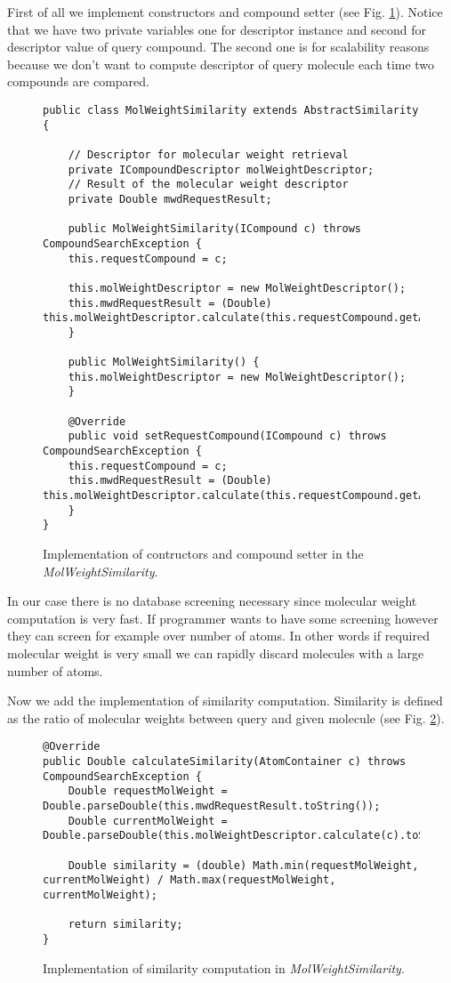 \documentclass[thesis=M,english]{FITthesis}[2012/10/20]
\begin{document}
First of all we implement constructors and compound setter (see Fig. \ref{MolWeightSimilarity1}). Notice that we have two private variables one for descriptor instance and second for descriptor value of query compound. The second one is for scalability reasons because we don’t want to compute descriptor of query molecule each time two compounds are compared. 

\begin{figure}
\begin{lstlisting}
public class MolWeightSimilarity extends AbstractSimilarity {

    // Descriptor for molecular weight retrieval
    private ICompoundDescriptor molWeightDescriptor;
    // Result of the molecular weight descriptor
    private Double mwdRequestResult;

    public MolWeightSimilarity(ICompound c) throws CompoundSearchException {
	this.requestCompound = c;

	this.molWeightDescriptor = new MolWeightDescriptor();
	this.mwdRequestResult = (Double) this.molWeightDescriptor.calculate(this.requestCompound.getAtomContainer());
    }

    public MolWeightSimilarity() {
	this.molWeightDescriptor = new MolWeightDescriptor();
    }

    @Override
    public void setRequestCompound(ICompound c) throws CompoundSearchException {
	this.requestCompound = c;
	this.mwdRequestResult = (Double) this.molWeightDescriptor.calculate(this.requestCompound.getAtomContainer());
    }
}

\end{lstlisting}
\caption{Implementation of contructors and compound setter in the \textit{MolWeightSimilarity}.}
\label{MolWeightSimilarity1}
\end{figure}

In our case there is no database screening necessary since molecular weight computation is very fast. If programmer wants to have some screening however they can screen for example over number of atoms. In other words if required molecular weight is very small we can rapidly discard molecules with a large number of atoms.

Now we add the implementation of similarity computation. Similarity is defined as the ratio of molecular weights between query and given molecule (see Fig. \ref{MolWeightSimilarity2}).

\begin{figure}
\begin{lstlisting}
@Override
public Double calculateSimilarity(AtomContainer c) throws CompoundSearchException {
    Double requestMolWeight = Double.parseDouble(this.mwdRequestResult.toString());
    Double currentMolWeight = Double.parseDouble(this.molWeightDescriptor.calculate(c).toString());

    Double similarity = (double) Math.min(requestMolWeight, currentMolWeight) / Math.max(requestMolWeight, currentMolWeight);

    return similarity;
}
\end{lstlisting}
\caption{Implementation of similarity computation in \textit{MolWeightSimilarity}.}
\label{MolWeightSimilarity2}
\end{figure}
\end{document}
